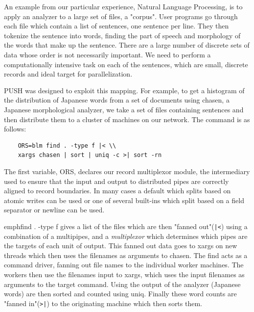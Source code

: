 An example from our particular experience, Natural Language Processing, is
to apply an analyzer to a large set of files, a "corpus". User programs go
through each file which contain a list of sentences, one sentence per line.
They then tokenize the sentence into words, finding the part of speech and
morphology of the words that make up the sentence.
There are a large number of discrete sets of data whose order is not 
necessarily important. We need to perform a computationally intensive task 
on each of the sentences, which are small, discrete records and ideal target 
for parallelization.

PUSH was designed to exploit this mapping. For example, to get a histogram of
the distribution of Japanese words from a set of documents using chasen,
a Japanese morphological analyzer, we take a set of files containing sentences
and then distribute them to a cluster of machines on our network. The command
is as follows:
%
%
\begin{verbatim}
    ORS=blm find . -type f |< \\
    xargs chasen | sort | uniq -c >| sort -rn
\end{verbatim}

The first variable, ORS, declares our record multiplexor module, 
the intermediary used to ensure that the input and output to 
distributed pipes are correctly aligned to record boundaries. 
In many cases a default which splits based on atomic writes can
be used or one of several built-ins which split based on a field
separator or newline can be used.

emph{find . -type f} gives a list of the files
which are then "fanned out"(\verb!|<!) using a combination
of a multipipes, and a \emph{multiplexor}
which determines which pipes are the targets of each unit of output.
This fanned out data goes to xargs on new threads
which then uses the filenames as arguments to
chasen. The find acts as a command driver, fanning out file names to the
individual worker machines. The workers then use the filenames input to
xargs, which uses the input filenames as arguments to the target command.
Using the output of the analyzer (Japanese words) are then sorted and 
counted using uniq.  Finally these word counts are "fanned in"(\verb!>|!) 
to the originating machine which then sorts them.

